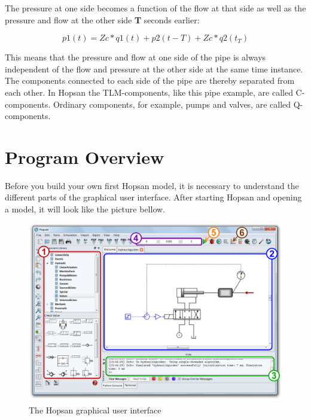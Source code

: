 \documentclass[a4paper,pdftex]{article}
\begin{document}
The pressure at one side becomes a function of the flow at that side as well as the pressure and flow at the other side \textbf{T} seconds earlier:

\begin{equation}
 p1(t) = Zc*q1(t) + p2(t-T) + Zc*q2(t_T)
\end{equation}

This means that the pressure and flow at one side of the pipe is always independent of the flow and pressure at the other side at the same time instance.
The components connected to each side of the pipe are thereby separated from each other.
In Hopsan the TLM-components, like this pipe example, are called  C-components.
Ordinary components, for example, pumps and valves, are called Q-components.

\section*{Program Overview}
Before you build your own first Hopsan model, it is necessary to understand the different parts of the graphical user interface.
After starting Hopsan and opening a model, it will look like the picture bellow.  

\begin{figure}[ht]
  \centering
  \includegraphics[width=\textwidth]{gfx/screenshot.pdf}
  \caption{The Hopsan graphical user interface}
  \label{fig:hopsan_gui}
\end{figure}
\end{document}
